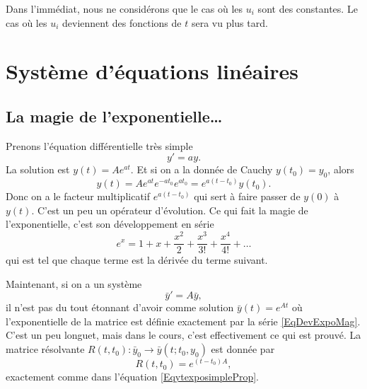 Dans l'immédiat, nous ne considérons que le cas où les \( u_i\) sont des constantes. Le cas où les \( u_i\) deviennent des fonctions de \( t\) sera vu plus tard.

\section{Système d'équations linéaires}

\subsection{La magie de l'exponentielle\ldots}
\label{SUBSECooMDKIooKaaKlZ}

Prenons l'équation différentielle très simple
\begin{equation}
	y'=ay.
\end{equation}
La solution est \( y(t)=A e^{at}\). Et si on a la donnée de Cauchy \( y(t_0)=y_0\), alors
\begin{equation}		\label{EqytexposimpleProp}
	y(t)=A e^{at} e^{-at_0} e^{at_0}= e^{a(t-t_0)}y(t_0).
\end{equation}
Donc on a le facteur multiplicatif \(  e^{a(t-t_0)}\) qui sert à faire passer de \( y(0)\) à \( y(t)\). C'est un peu un opérateur d'évolution. Ce qui fait la magie  de l'exponentielle, c'est son développement en série
\begin{equation}		\label{EqDevExpoMag}
	e^x=1+x+\frac{ x^2 }{ 2 }+\frac{ x^3 }{ 3! }+\frac{ x^4 }{ 4! }+\ldots
\end{equation}
qui est tel que chaque terme est la dérivée du terme suivant.

Maintenant, si on a un système
\begin{equation}
	\bar y'=A\bar y,
\end{equation}
il n'est pas du tout étonnant d'avoir comme solution \( \bar y(t)= e^{At}\) où l'exponentielle de la matrice est définie exactement par la série \eqref{EqDevExpoMag}. C'est un peu longuet, mais dans le cours, c'est effectivement ce qui est prouvé. La matrice résolvante \( R(t,t_0)\colon \bar y_0\to \bar y(t;t_0,y_0)\) est donnée par
\begin{equation}
	R(t,t_0)= e^{(t-t_0)A},
\end{equation}
exactement comme dans l'équation \eqref{EqytexposimpleProp}.

